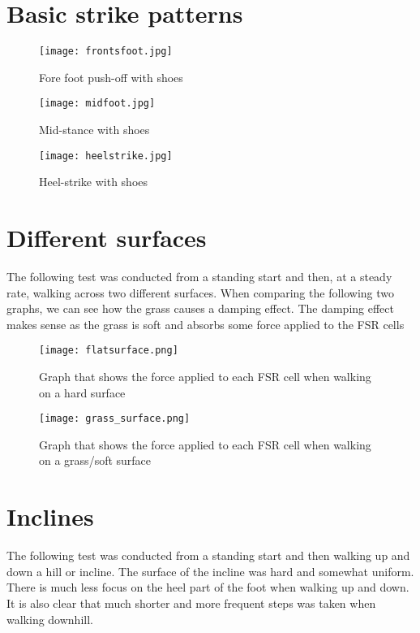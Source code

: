 \section{Basic strike patterns}
\label{sec:basicstrike}
\begin{figure}[!htb]
    \centering
    \texttt{[image: frontsfoot.jpg]}
    \caption{Fore foot push-off with shoes}
    \label{fig:frontstrike}
\end{figure}
\begin{figure}[!htb]
    \centering
    \texttt{[image: midfoot.jpg]}
    \caption{Mid-stance with shoes}
    \label{fig:midstrike}
\end{figure}
\clearpage
\begin{figure}[!htb]
    \centering
    \texttt{[image: heelstrike.jpg]}
    \caption{Heel-strike with shoes}
    \label{fig:hellstrike}
\end{figure}
\clearpage
\section{Different surfaces}
\label{sec:surfaces}

The following test was conducted from a standing start and then, at a steady rate, walking across two different surfaces. When comparing the following two graphs, we can see how the grass causes a damping effect. The damping effect makes sense as the grass is soft and absorbs some force applied to the FSR cells  

\begin{figure}[!htb]
    \centering
    \texttt{[image: flatsurface.png]}
    \caption{Graph that shows the force applied to each FSR cell when walking on a hard surface}
    \label{fig:hardflat}
\end{figure}

\begin{figure}[!htb]
    \centering
    \texttt{[image: grass\_surface.png]}
    \caption{Graph that shows the force applied to each FSR cell when walking on a grass/soft surface}
    \label{fig:softsurf}
\end{figure}
\clearpage
\section{Inclines}
\label{sec:inclines}
The following test was conducted from a standing start and then walking up and down a hill or incline. The surface  of the incline was hard and somewhat uniform. There is much less focus on the heel part of the foot when walking up and down. It is also clear that much shorter and more frequent steps was taken when walking downhill. 

